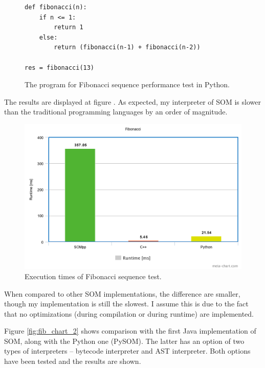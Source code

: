 \documentclass[thesis=M,english]{FITthesis}[2019/12/23]
\begin{document}
\begin{figure}
	\centering
	\begin{verbatim}
def fibonacci(n):
    if n <= 1:
	    return 1
	else:
        return (fibonacci(n-1) + fibonacci(n-2))

res = fibonacci(13)
	\end{verbatim}
	\caption{The program for Fibonacci sequence performance test in Python.}
	\label{fig:fib_py}
\end{figure}

The results are displayed at figure . As expected, my interpreter of SOM is slower than the traditional programming languages by an order of magnitude.
\begin{figure}
	\centering
	\includegraphics[width=\linewidth]{media/fib_chart_1.png}
	\caption{Execution times of Fibonacci sequence test.}
	\label{fig:fib_chart}
\end{figure}

When compared to other SOM implementations, the difference are smaller, though my implementation is still the slowest. I assume this is
due to the fact that no optimizations (during compilation or during runtime) are implemented. 

Figure \ref{fig:fib_chart_2} shows comparison with the first Java implementation of SOM, along with the Python one (PySOM). The latter has an option of two types
of interpreters -- bytecode interpreter and AST interpreter. Both options have been tested and the results are shown.
\end{document}
